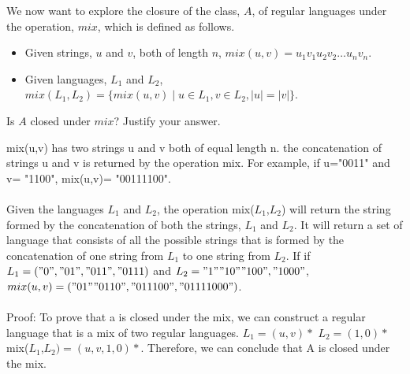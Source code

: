\documentclass[addpoints]{exam}
\begin{document}
\begin{questions}
\begin{solution}
 
  
  
  
  
  \end{solution}

\question[5] We now want to explore the closure of the class, $A$, of regular languages under the operation, $mix$, which is defined as follows.
  \begin{itemize}
  \item Given strings, $u$ and $v$, both of length $n$, $mix(u,v) = u_1v_1u_2v_2\ldots u_nv_n$.
  \item Given languages, $L_1$ and $L_2$, $mix(L_1,L_2) = \{mix(u,v) \mid u\in L_1, v\in L_2, |u| = |v|\}$.
  \end{itemize}
  Is $A$ closed under $mix$? Justify your answer.
  \begin{solution}
  mix(u,v) has two strings u and v both of equal length n. the concatenation of strings u and v is returned by the operation mix. For example, if u="0011" and v= "1100", mix(u,v)= "00111100". 
  \\
  \\
  Given the languages $L_1$ and $L_2$, the operation mix($L_1$,$L_2$) will return the string formed by the concatenation of both the strings, $L_1$ and $L_2$. It will return a set of language that consists of all the possible strings that is formed by the concatenation of one string from $L_1$ to one string from $L_2$. If if $L_1=("0", "01", "011", "0111)$ and $L_2= "1" "10" "100", "1000"$, $mix(u,v)= ("01" "0110", "011100", "01111000")$. 
  \\\\
 Proof:
 To prove that a is closed under the mix, we can construct a regular language that is a mix of two regular languages. 
 $L_1 = (u,v)*$
 $L_2= (1,0)*$
 mix($L_1$,$L_2)= (u,v,1,0)*$. 
 Therefore, we can conclude that A is closed under the mix.
  \end{solution}
  
\end{questions}
\end{document}
